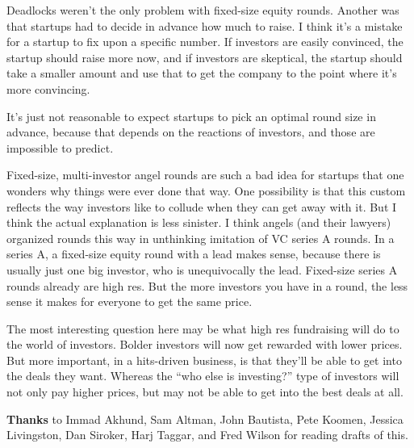 Deadlocks weren't the only problem with fixed-size equity rounds.
Another was that startups had to decide in advance how much to raise. I
think it's a mistake for a startup to fix upon a specific number. If
investors are easily convinced, the startup should raise more now, and
if investors are skeptical, the startup should take a smaller amount and
use that to get the company to the point where it's more convincing.

It's just not reasonable to expect startups to pick an optimal round
size in advance, because that depends on the reactions of investors, and
those are impossible to predict.

Fixed-size, multi-investor angel rounds are such a bad idea for startups
that one wonders why things were ever done that way. One possibility is
that this custom reflects the way investors like to collude when they
can get away with it. But I think the actual explanation is less
sinister. I think angels (and their lawyers) organized rounds this way
in unthinking imitation of VC series A rounds. In a series A, a
fixed-size equity round with a lead makes sense, because there is
usually just one big investor, who is unequivocally the lead. Fixed-size
series A rounds already are high res. But the more investors you have in
a round, the less sense it makes for everyone to get the same price.

The most interesting question here may be what high res fundraising will
do to the world of investors. Bolder investors will now get rewarded
with lower prices. But more important, in a hits-driven business, is
that they'll be able to get into the deals they want. Whereas the ``who
else is investing?'' type of investors will not only pay higher prices,
but may not be able to get into the best deals at all.

\textbf{Thanks} to Immad Akhund, Sam Altman, John Bautista, Pete Koomen,
Jessica Livingston, Dan Siroker, Harj Taggar, and Fred Wilson for
reading drafts of this.
